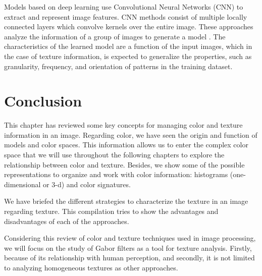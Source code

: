Models based on deep learning use Convolutional Neural Networks (CNN) to extract and represent image features. CNN methods consist of multiple locally connected layers which convolve kernels over the entire image. These approaches analyze the information of a group of images to generate a model \citep{Lin.Maji:CVPR:2016}. The characteristics of the learned model are a function of the input images, which in the case of texture information, is expected to generalize the properties, such as granularity, frequency, and orientation of patterns in the training dataset.

\section{Conclusion}

This chapter has reviewed some key concepts for managing color and texture information in an image. Regarding color, we have seen the origin and function of models and color spaces. This information allows us to enter the complex color space that we will use throughout the following chapters to explore the relationship between color and texture. Besides, we show some of the possible representations to organize and work with color information: histograms (one-dimensional or 3-d) and color signatures.

We have briefed the different strategies to characterize the texture in an image regarding texture. This compilation tries to show the advantages and disadvantages of each of the approaches.

Considering this review of color and texture techniques used in image processing, we will focus on the study of Gabor filters as a tool for texture analysis. Firstly, because of its relationship with human perception, and secondly, it is not limited to analyzing homogeneous textures as other approaches.
